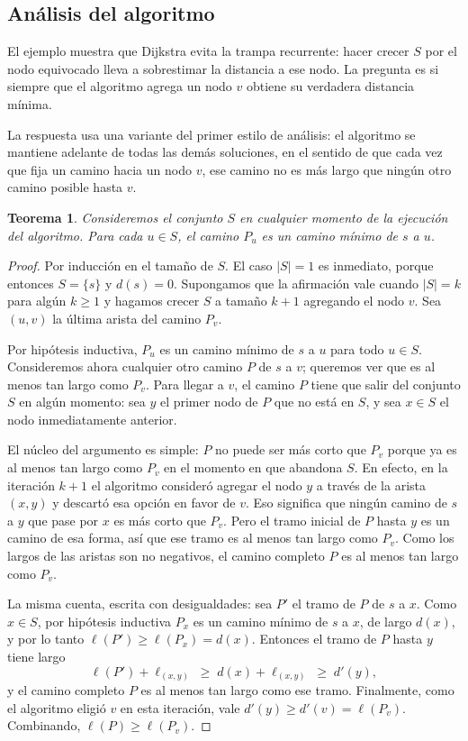 \documentclass[12pt, spanish, oneside, openany]{book}
\theoremstyle{uprightplain}
\newtheorem{teorema}{Teorema}[section]
\theoremstyle{definition}
\theoremstyle{remark}
\theoremstyle{definition}
\begin{document}
\subsection{Análisis del algoritmo}

El ejemplo muestra que Dijkstra evita la trampa recurrente: hacer crecer $S$ por el nodo equivocado lleva a sobrestimar la distancia a ese nodo. La pregunta es si siempre que el algoritmo agrega un nodo $v$ obtiene su verdadera distancia mínima.

La respuesta usa una variante del primer estilo de análisis: el algoritmo se mantiene adelante de todas las demás soluciones, en el sentido de que cada vez que fija un camino hacia un nodo $v$, ese camino no es más largo que ningún otro camino posible hasta $v$.

\begin{teorema}
\label{teo:dijkstra}
Consideremos el conjunto $S$ en cualquier momento de la ejecución del algoritmo. Para cada $u \in S$, el camino $P_u$ es un camino mínimo de $s$ a $u$.
\end{teorema}
\begin{proof}
Por inducción en el tamaño de $S$. El caso $|S|=1$ es inmediato, porque entonces $S=\{s\}$ y $d(s)=0$. Supongamos que la afirmación vale cuando $|S|=k$ para algún $k \ge 1$ y hagamos crecer $S$ a tamaño $k+1$ agregando el nodo $v$. Sea $(u,v)$ la última arista del camino $P_v$.

Por hipótesis inductiva, $P_u$ es un camino mínimo de $s$ a $u$ para todo $u \in S$. Consideremos ahora cualquier otro camino $P$ de $s$ a $v$; queremos ver que es al menos tan largo como $P_v$. Para llegar a $v$, el camino $P$ tiene que salir del conjunto $S$ en algún momento: sea $y$ el primer nodo de $P$ que no está en $S$, y sea $x \in S$ el nodo inmediatamente anterior.

El núcleo del argumento es simple: $P$ no puede ser más corto que $P_v$ porque ya es al menos tan largo como $P_v$ en el momento en que abandona $S$. En efecto, en la iteración $k+1$ el algoritmo consideró agregar el nodo $y$ a través de la arista $(x,y)$ y descartó esa opción en favor de $v$. Eso significa que ningún camino de $s$ a $y$ que pase por $x$ es más corto que $P_v$. Pero el tramo inicial de $P$ hasta $y$ es un camino de esa forma, así que ese tramo es al menos tan largo como $P_v$. Como los largos de las aristas son no negativos, el camino completo $P$ es al menos tan largo como $P_v$.

La misma cuenta, escrita con desigualdades: sea $P'$ el tramo de $P$ de $s$ a $x$. Como $x \in S$, por hipótesis inductiva $P_x$ es un camino mínimo de $s$ a $x$, de largo $d(x)$, y por lo tanto $\ell(P') \ge \ell(P_x)=d(x)$. Entonces el tramo de $P$ hasta $y$ tiene largo
\[
\ell(P') + \ell_{(x,y)} \;\ge\; d(x) + \ell_{(x,y)} \;\ge\; d'(y),
\]
y el camino completo $P$ es al menos tan largo como ese tramo. Finalmente, como el algoritmo eligió $v$ en esta iteración, vale $d'(y) \ge d'(v)=\ell(P_v)$. Combinando, $\ell(P) \ge \ell(P_v)$.
\end{proof}
\end{document}
